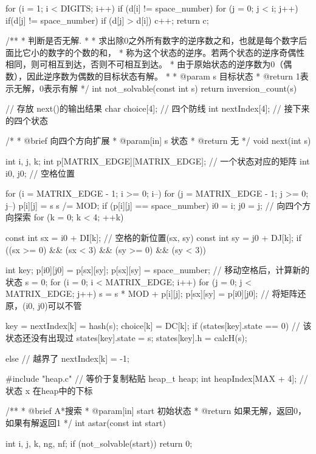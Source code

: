 \begin{Codex}[label=eight_digits_astar.c]
{    for (i = 1; i < DIGITS; i++)  if (d[i] != space_number) {
        for (j = 0; j < i; j++) {
            if(d[j] != space_number) {
                if (d[j] > d[i]) {
                    c++;
                }
            }
        }
    }
    return c;
}

/**
 * 判断是否无解.
 *
 * 求出除0之外所有数字的逆序数之和，也就是每个数字后面比它小的数字的个数的和，
 * 称为这个状态的逆序。若两个状态的逆序奇偶性相同，则可相互到达，否则不可相互到达。
 * 由于原始状态的逆序数为0（偶数），因此逆序数为偶数的目标状态有解。
 *
 * @param s 目标状态
 * @return 1表示无解，0表示有解
 */
int not_solvable(const int s) {
    return inversion_count(s) %
}

// 存放 next()的输出结果
char choice[4]; // 四个防线
int nextIndex[4]; // 接下来的四个状态

/*
 * @brief 向四个方向扩展
 * @param[in] s 状态
 * @return 无
 */
void next(int s) {
    int i, j, k;
    int p[MATRIX_EDGE][MATRIX_EDGE]; // 一个状态对应的矩阵
    int i0, j0;  // 空格位置

    for (i = MATRIX_EDGE - 1; i >= 0; i--) {
        for (j = MATRIX_EDGE - 1; j >= 0; j--) {
            p[i][j] = s %
            s /= MOD;
            if (p[i][j] == space_number) {
                i0 = i;
                j0 = j;
            }
        }
    }
    // 向四个方向探索
    for (k = 0; k < 4; ++k) {
        const int sx = i0 + DI[k]; // 空格的新位置(sx, sy)
        const int sy = j0 + DJ[k];
        if ((sx >= 0) && (sx < 3) && (sy >= 0) && (sy < 3)) {
            int key;
            p[i0][j0] = p[sx][sy];
            p[sx][sy] = space_number;
            // 移动空格后，计算新的状态
            s = 0;
            for (i = 0; i < MATRIX_EDGE; i++)
                for (j = 0; j < MATRIX_EDGE; j++)
                    s = s * MOD + p[i][j];
            p[sx][sy] = p[i0][j0]; // 将矩阵还原，(i0, j0)可以不管
            
            key = nextIndex[k] = hash(s);
            choice[k] = DC[k];
            if (states[key].state == 0) { // 该状态还没有出现过
                states[key].state = s;
                states[key].h = calcH(s);
            }
        } else {// 越界了
            nextIndex[k] = -1;
        }
    }
}


#include "heap.c" // 等价于复制粘贴
heap_t heap;
int heapIndex[MAX + 4]; // 状态 x 在heap中的下标

/**
 * @brief A*搜索
 * @param[in] start 初始状态
 * @return 如果无解，返回0，如果有解返回1
 */
int astar(const int start) {
    int i, j, k, ng, nf;
    if (not_solvable(start)) return 0;

}
\end{Codex}
